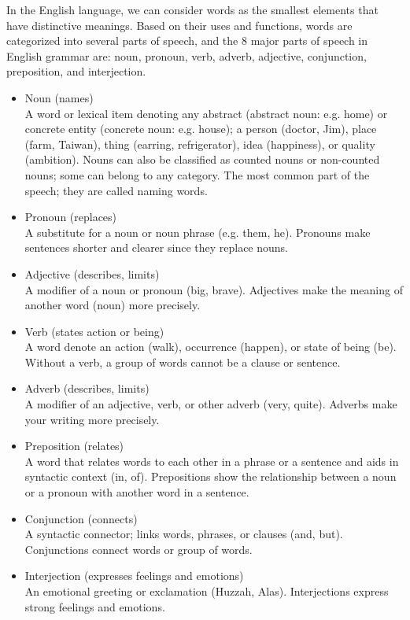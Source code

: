 In the English language, we can consider words as the smallest elements that have distinctive meanings.
Based on their uses and functions, words are categorized into several parts of speech, and the 8 major parts of speech in 
English grammar are: noun, pronoun, verb, adverb, adjective, conjunction, preposition, and interjection.
\begin{itemize}
	\item Noun (names)\\
	A word or lexical item denoting any abstract (abstract noun: e.g. home) or concrete entity (concrete noun: e.g. house); a person (doctor, Jim), place (farm, Taiwan), thing (earring, refrigerator), idea (happiness), or quality (ambition). 
	Nouns can also be classified as counted nouns or non-counted nouns; some can belong to any category. 
	The most common part of the speech; they are called naming words.
	
	\item Pronoun (replaces)\\
	A substitute for a noun or noun phrase (e.g. them, he). Pronouns make sentences shorter and clearer since they replace nouns.
	
	\item Adjective (describes, limits)\\
	A modifier of a noun or pronoun (big, brave). 
	Adjectives make the meaning of another word (noun) more precisely.
	
	\item Verb (states action or being)\\
	A word denote an action (walk), occurrence (happen), or state of being (be).
	Without a verb, a group of words cannot be a clause or sentence.
	\item Adverb (describes, limits)\\
	A modifier of an adjective, verb, or other adverb (very, quite). 
	Adverbs make your writing more precisely.
	
	\item Preposition (relates)\\
	A word that relates words to each other in a phrase or a sentence and aids in syntactic context (in, of). 
	Prepositions show the relationship between a noun or a pronoun with another word in a sentence.
	
	\item Conjunction (connects)\\
	A syntactic connector; links words, phrases, or clauses (and, but). 
	Conjunctions connect words or group of words.
	
	\item Interjection (expresses feelings and emotions)\\
	An emotional greeting or exclamation (Huzzah, Alas). 
	Interjections express strong feelings and emotions.
\end{itemize}

